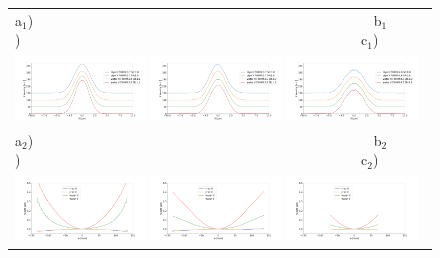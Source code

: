 \documentclass[]{spie}  %
\begin{document}
   \begin{figure} [ht]
   \begin{center}
   \begin{tabular}{l} 
   a$_1$)~~~~~~~~~~~~~~~~~~~~~~~~~~~~~~~~~~~~~~~~~~~~~~~~
   b$_1$)~~~~~~~~~~~~~~~~~~~~~~~~~~~~~~~~~~~~~~~~~~~~~~~~
   c$_1$)\\

   \includegraphics[width=0.32\textwidth]{figures/intensitycorrected.png}
   \includegraphics[width=0.32\textwidth]{figures/intensitycorrectedfit.png}
   \includegraphics[width=0.32\textwidth]{figures/intensitycorrectedfitcrop.png}\\
  a$_2$)~~~~~~~~~~~~~~~~~~~~~~~~~~~~~~~~~~~~~~~~~~~~~~~~
  b$_2$)~~~~~~~~~~~~~~~~~~~~~~~~~~~~~~~~~~~~~~~~~~~~~~~~
  c$_2$)\\
   \includegraphics[width=0.32\textwidth]{figures/correctedprofiles.png}
   \includegraphics[width=0.32\textwidth]{figures/correctedprofilesfitextrapolated.png}
   \includegraphics[width=0.32\textwidth]{figures/correctedprofilesfit.png}



\end{tabular}
\end{center}
\end{figure}
\end{document}
